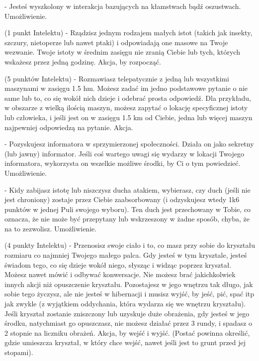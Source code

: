 { - Jesteś wyszkolony w interakcja bazujących na kłamstwach bądź oszustwach. Umożliwienie. 

 (1 punkt Intelektu) - Rządzisz jednym rodzajem małych istot (takich jak insekty, szczury, nietoperze lub nawet ptaki) i odpowiadają one masowe na Twoje wezwanie. Twoje istoty w średnim zasięgu nie zranią Ciebie lub tych, których wskażesz przez jedną godzinę. Akcja, by rozpocząć. 

 (5 punktów Intelektu) - Rozmawiasz telepatycznie z jedną lub wszystkimi maszynami w zasięgu 1.5 hm. Możesz zadać im jedno podstawowe pytanie o nie same lub to, co się wokół nich dzieje i odebrać prosta odpowiedź. Dla przykładu, w obszarze z wielką ilością maszyn, możesz zapytać o lokację specyficznej istoty lub człowieka, i jeśli jest on w zasięgu 1.5 km od Ciebie, jedna lub więcej maszyn najpewniej odpowiedzą na pytanie. Akcja.

 - Pozyskujesz informatora w sprzymierzonej społeczności. Działa on jako sekretny (lub jawny) informator. Jeśli coś wartego uwagi się wydarzy w lokacji Twojego informatora, wykorzysta on wszelkie możliwe środki, by Ci o tym powiedzieć. Umożliwienie.

 - Kidy zabijasz istotę lub niszczysz ducha atakiem, wybierasz, czy duch (jeśli nie jest chroniony) zostaje przez Ciebie zaabsorbowany (i odzyskujesz wtedy 1k6 punktów w jednej Puli swojego wyboru). Ten duch jest przechowany w Tobie, co oznacza, że nie może być przepytany lub wskrzeszony w żadne sposób, chyba, że na to zezwolisz. Umożliwienie. 

 (4 punkty Intelektu) - Przenosisz swoje ciało i to, co masz przy sobie do kryształu rozmiaru co najmniej Twojego małego palca. Gdy jesteś w tym krysztale, jesteś świadom tego, co się dzieje wokół niego, słysząc i widząc poprzez kryształ. Możesz nawet mówić i odbywać konwersacje. Nie możesz brać jakichkolwiek innych akcji niż opuszczenie kryształu. Pozostajesz w jego wnętrzu tak długo, jak sobie tego życzysz, ale nie jesteś w hibernacji i musisz wyjść, by jeść, pić, spać itp jak zwykle (z wyjątkiem oddychania, która wydarza się we wnętrzu kryształu). Jeśli kryształ zostanie zniszczony lub uzyskuje duże obrażenia, gdy jesteś w jego środku, natychmiast go opuszczasz, nie możesz działać przez 3 rundy, i spadasz o 2 stopnie na liczniku obrażeń. Akcja, by wejść i wyjść. (Postać powinna określić, gdzie umieszcza kryształ, w który chce wejść, nawet jeśli jest to grunt przed jej stopami).

}
